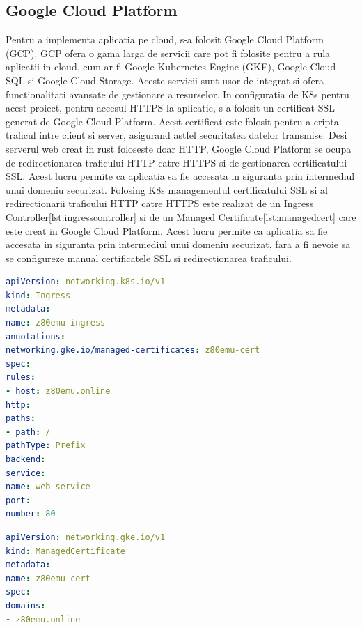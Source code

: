 \documentclass[titlepage,12pt]{article}
\DeclareRobustCommand{\code}[1]{{\ttfamily\small #1}}
\begin{document}
\subsection{Google Cloud Platform}
Pentru a implementa aplicatia pe cloud, s-a folosit Google Cloud Platform (GCP). GCP ofera o gama larga de servicii care pot fi folosite pentru a rula aplicatii in cloud, cum ar fi Google Kubernetes Engine (GKE), Google Cloud SQL si Google Cloud Storage. Aceste servicii sunt usor de integrat si ofera functionalitati avansate de gestionare a resurselor.
In configuratia de \ac {K8s} pentru acest proiect, pentru accesul \code{HTTPS} la aplicatie, s-a folosit un certificat \code{SSL} generat de Google Cloud Platform. Acest certificat este folosit pentru a cripta traficul intre client si server, asigurand astfel securitatea datelor transmise. Desi serverul web creat in rust foloseste doar \code{HTTP}, Google Cloud Platform se ocupa de redirectionarea traficului \code{HTTP} catre \code{HTTPS} si de gestionarea certificatului \code{SSL}. Acest lucru permite ca aplicatia sa fie accesata in siguranta prin intermediul unui domeniu securizat.
Folosing \ac {K8s} managementul certificatului \code{SSL} si al redirectionarii traficului \code{HTTP} catre \code{HTTPS} este realizat de un \code{Ingress Controller}\cref{lst:ingresscontroller} si de un \code{Managed Certificate}\cref{lst:managedcert} care este creat in Google Cloud Platform. Acest lucru permite ca aplicatia sa fie accesata in siguranta prin intermediul unui domeniu securizat, fara a fi nevoie sa se configureze manual certificatele \code{SSL} si redirectionarea traficului.

\begin{lstlisting}[language=yaml,caption={Ingress Controller pentru aplicatie},label={lst:ingresscontroller}]
apiVersion: networking.k8s.io/v1
kind: Ingress
metadata:
name: z80emu-ingress
annotations:
networking.gke.io/managed-certificates: z80emu-cert
spec:
rules:
- host: z80emu.online
http:
paths:
- path: /
pathType: Prefix
backend:
service:
name: web-service
port:
number: 80
\end{lstlisting}

\begin{lstlisting}[language=yaml,caption={Managed Certificate pentru aplicatie},label={lst:managedcert}]
apiVersion: networking.gke.io/v1
kind: ManagedCertificate
metadata:
name: z80emu-cert
spec:
domains:
- z80emu.online
\end{lstlisting}
\end{document}

